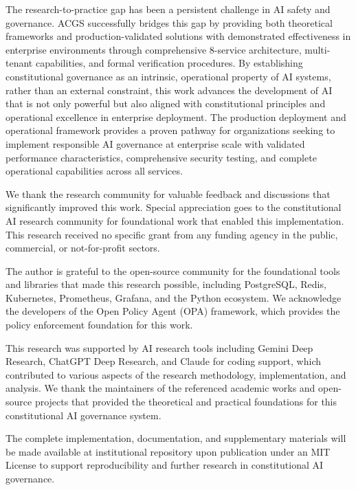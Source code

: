 \documentclass[manuscript,screen,9pt]{acmart}
\begin{document}
The research-to-practice gap has been a persistent challenge in AI safety and governance. ACGS successfully bridges this gap by providing both theoretical frameworks and production-validated solutions with demonstrated effectiveness in enterprise environments through comprehensive 8-service architecture, multi-tenant capabilities, and formal verification procedures. By establishing constitutional governance as an intrinsic, operational property of AI systems, rather than an external constraint, this work advances the development of AI that is not only powerful but also aligned with constitutional principles and operational excellence in enterprise deployment. The production deployment and operational framework provides a proven pathway for organizations seeking to implement responsible AI governance at enterprise scale with validated performance characteristics, comprehensive security testing, and complete operational capabilities across all services.

\begin{acks}
We thank the research community for valuable feedback and discussions that significantly improved this work. Special appreciation goes to the constitutional AI research community for foundational work that enabled this implementation. This research received no specific grant from any funding agency in the public, commercial, or not-for-profit sectors.

The author is grateful to the open-source community for the foundational tools and libraries that made this research possible, including PostgreSQL, Redis, Kubernetes, Prometheus, Grafana, and the Python ecosystem. We acknowledge the developers of the Open Policy Agent (OPA) framework, which provides the policy enforcement foundation for this work.

This research was supported by AI research tools including Gemini Deep Research, ChatGPT Deep Research, and Claude for coding support, which contributed to various aspects of the research methodology, implementation, and analysis. We thank the maintainers of the referenced academic works and open-source projects that provided the theoretical and practical foundations for this constitutional AI governance system.

The complete implementation, documentation, and supplementary materials will be made available at institutional repository upon publication under an MIT License to support reproducibility and further research in constitutional AI governance.
\end{acks}
\end{document}
